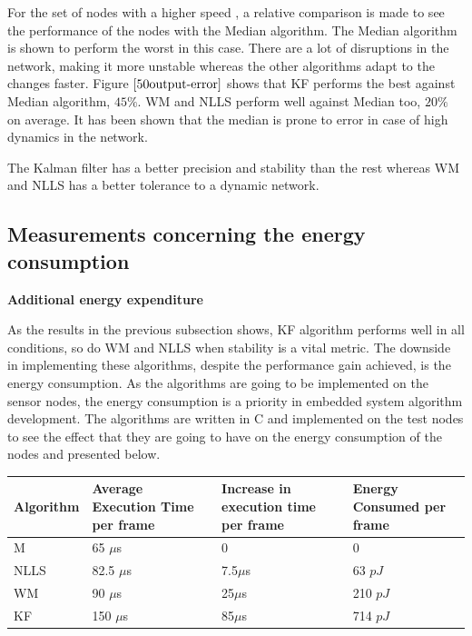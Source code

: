 \documentclass[journal]{IEEEtran}
\begin{document}
\par
For the set of nodes with a higher speed , a relative comparison is made to see the performance of the nodes with the Median algorithm. The Median algorithm is shown to perform the worst in this case. There are a lot of disruptions in the network, making it more unstable whereas the other algorithms adapt to the changes faster. Figure $\ref{50output-error}$ shows that KF performs the best against Median algorithm, $45\%$. WM and NLLS perform well against Median too, $20\%$ on average. It has been shown that the median is prone to error in case of high dynamics in the network.
\par 
The Kalman filter has a better precision and stability than the rest whereas WM and NLLS has a better tolerance to a dynamic network.
\subsection{\textbf{Measurements concerning the energy consumption}}\noindent
\textbf{Additional energy expenditure}\par \noindent
As the results in the previous subsection shows, KF algorithm performs well in all conditions, so do WM and NLLS when stability is a vital metric. The downside in implementing these algorithms, despite the performance gain achieved, is the energy consumption. As the algorithms are going to be implemented on the sensor nodes, the energy consumption is a priority in embedded system algorithm development. The algorithms are written in C and implemented on the test nodes to see the effect that they are going to have on the energy consumption of the nodes and presented below.
\begin{center}
    \begin{tabular}{ |p{1.5cm} | p{2cm} |p{2cm} |p{1.75cm} | }
    \hline
    Algorithm & Average Execution Time per frame & Increase in execution time per frame & Energy Consumed per frame \\ \hline
    M &  65 $\mu$s & 0 & 0  \\ \hline
    NLLS & 82.5 $\mu$s & 7.5$\mu$s & 63 $pJ$  \\ \hline
    WM &   90 $\mu$s & 25$\mu$s & 210 $pJ$ \\ \hline
    KF &  150 $\mu$s  & 85$\mu$s &  714 $pJ$\\ \hline
    \end{tabular}
\label{tab}
\end{center}
\end{document}
